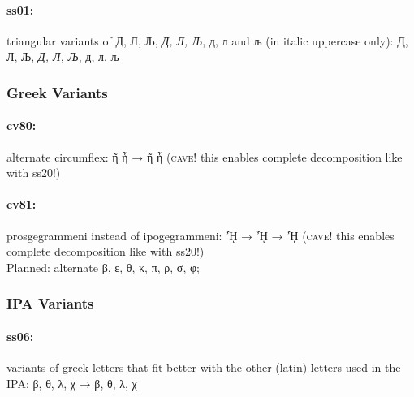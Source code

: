 \documentclass[pagesize,DIV14]{scrartcl}
\begin{document}
\paragraph*{ss01:} triangular variants of Д, Л, Љ, \textit{Д, Л, Љ}, д, л and љ (in italic uppercase only): { Д, Л, Љ, \textit{Д, Л, Љ}, д, л, љ 
}
{
\subsubsection{Greek Variants}
\paragraph*{cv80:} alternate circumflex: ῆ ἧ → {ῆ ἧ} (\textsc{cave!} this enables complete decomposition like with ss20!)
\paragraph*{cv81:} prosgegrammeni instead of ipogegrammeni: ᾞ → { ᾞ} → { ᾞ} (\textsc{cave!} this enables complete decomposition like with ss20!)\\
Planned: alternate β, ε, θ, κ, π, ρ, σ, φ;\\
}
\subsubsection{IPA Variants}
\paragraph*{ss06:} variants of greek letters that fit better with the other (latin) letters used in the IPA: β, θ, λ, χ → {β, θ, λ, χ}

\clearpage

\end{document}
